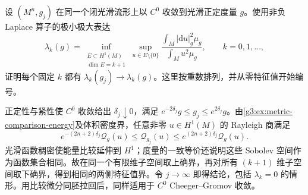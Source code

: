 \begin{exercise}\label{g3:ex:c0-metric-eigenvalues}
	设 \((M^n,g_j)\) 在同一个闭光滑流形上以 \(C^0\) 收敛到光滑正定度量 \(g\)。使用非负 Laplace 算子的极小极大表达
	\[
		\lambda_k(g)=\inf_{\substack{E\subset H^1(M)\\\dim E=k+1}}
		\sup_{u\in E\setminus\{0\}}
		\frac{\int_M|\mathrm du|_g^2\mu_g}{\int_Mu^2\mu_g},
		\qquad k=0,1,\ldots,
	\]
	证明每个固定 \(k\) 都有 \(\lambda_k(g_j)\to\lambda_k(g)\)。这里按重数排列，并从零特征值开始编号。
\end{exercise}
\begin{solution}
	正定性与紧性使 \(C^0\) 收敛给出 \(\delta_j\downarrow0\)，满足 \(e^{-2\delta_j}g\le g_j\le e^{2\delta_j}g\)。由\cref{g3:ex:metric-comparison-energy}及体积密度界，任意非零 \(u\in H^1(M)\) 的 Rayleigh 商满足
	\[
		e^{-(2n+2)\delta_j}\mathcal Q_g(u)
		\le\mathcal Q_{g_j}(u)
		\le e^{(2n+2)\delta_j}\mathcal Q_g(u).
	\]
	光滑函数稠密使能量比较延伸到 \(H^1\)；度量的一致等价还说明这些 Sobolev 空间作为函数集合相同。故在同一个有限维子空间取上确界，再对所有 \((k+1)\) 维子空间取下确界，得到相同的两侧特征值界。令 \(j\to\infty\) 即得结论，包括 \(\lambda_k=0\) 的情形。用比较微分同胚拉回后，同样适用于 \(C^0\) Cheeger--Gromov 收敛。
\end{solution}
